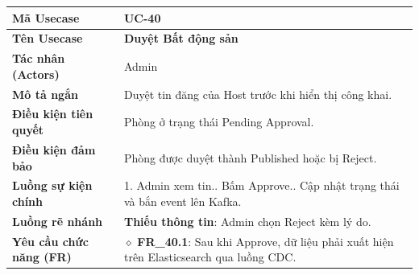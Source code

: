 \begin{table}[H]
\renewcommand{\arraystretch}{1.3}
\centering
\begin{tabularx}{\textwidth}{|p{4.5cm}|X|}
\hline
\cellcolor{gray!15}\bfseries Mã Usecase & \textbf{UC-40} \\ \hline
\cellcolor{gray!15}\bfseries Tên Usecase & \textbf{Duyệt Bất động sản} \\ \hline
\cellcolor{gray!15}\bfseries Tác nhân (Actors) & Admin \\ \hline
\cellcolor{gray!15}\bfseries Mô tả ngắn & Duyệt tin đăng của Host trước khi hiển thị công khai. \\ \hline
\cellcolor{gray!15}\bfseries Điều kiện tiên quyết & Phòng ở trạng thái Pending Approval. \\ \hline
\cellcolor{gray!15}\bfseries Điều kiện đảm bảo & Phòng được duyệt thành Published hoặc bị Reject. \\ \hline
\cellcolor{gray!15}\bfseries Luồng sự kiện chính & 1. Admin xem tin.\newline 2. Bấm Approve.\newline 3. Cập nhật trạng thái và bắn event lên Kafka. \\ \hline
\cellcolor{gray!15}\bfseries Luồng rẽ nhánh & \textbf{Thiếu thông tin}: Admin chọn Reject kèm lý do. \\ \hline
\cellcolor{gray!15}\bfseries Yêu cầu chức năng (FR) & $\diamond$ \textbf{FR\_40.1}: Sau khi Approve, dữ liệu phải xuất hiện trên Elasticsearch qua luồng CDC. \\ \hline
\end{tabularx}
\end{table}


